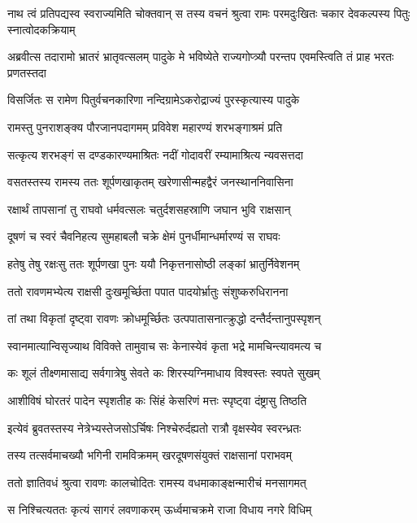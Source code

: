 नाथ त्वं प्रतिपद्यस्व स्वराज्यमिति चोक्तवान्
\twolineshloka
{स तस्य वचनं श्रुत्वा रामः परमदुःखितः}
{चकार देवकल्पस्य पितुः स्नात्वोदकक्रियाम्}


\threelineshloka
{अब्रवीत्स तदारामो भ्रातरं भ्रातृवत्सलम्}
{पादुके मे भविष्येते राज्यगोप्त्र्यौ परन्तप}
{एवमस्त्विति तं प्राह भरतः प्रणतस्तदा}


\twolineshloka
{विसर्जितः स रामेण पितुर्वचनकारिणा}
{नन्दिग्रामेऽकरोद्राज्यं पुरस्कृत्यास्य पादुके}


\twolineshloka
{रामस्तु पुनराशङ्क्य पौरजानपदागमम्}
{प्रविवेश महारण्यं शरभङ्गाश्रमं प्रति}


\twolineshloka
{सत्कृत्य शरभङ्गं स दण्डकारण्यमाश्रितः}
{नदीं गोदावरीं रम्यामाश्रित्य न्यवसत्तदा}


\twolineshloka
{वसतस्तस्य रामस्य ततः शूर्पणखाकृतम्}
{खरेणासीन्महद्वैरं जनस्थाननिवासिना}


\twolineshloka
{रक्षार्थं तापसानां तु राघवो धर्मवत्सलः}
{चतुर्दशसहस्राणि जघान भुवि राक्षसान्}


\twolineshloka
{दूषणं च स्वरं चैवनिहत्य सुमहाबलौ}
{चक्रे क्षेमं पुनर्धीमान्धर्मारण्यं स राघवः}


\twolineshloka
{हतेषु तेषु रक्षःसु ततः शूर्पणखा पुनः}
{ययौ निकृत्तनासोष्ठी लङ्कां भ्रातुर्निवेशनम्}


\twolineshloka
{ततो रावणमभ्येत्य राक्षसी दुःखमूर्च्छिता}
{पपात पादयोर्भ्रातुः संशुष्करुधिरानना}


\twolineshloka
{तां तथा विकृतां दृष्ट्वा रावणः क्रोधमूर्च्छितः}
{उत्पपातासनात्क्रुद्धो दन्तैर्दन्तानुपस्पृशन्}


\twolineshloka
{स्वानमात्यान्विसृज्याथ विविक्ते तामुवाच सः}
{केनास्येवं कृता भद्रे मामचिन्त्यावमत्य च}


\twolineshloka
{कः शूलं तीक्ष्णमासाद्य सर्वगात्रेषु सेवते}
{कः शिरस्यग्निमाधाय विश्वस्तः स्वपते सुखम्}


\twolineshloka
{आशीविषं घोरतरं पादेन स्पृशतीह कः}
{सिंहं केसरिणं मत्तः स्पृष्ट्वा दंष्ट्रासु तिष्ठति}


\twolineshloka
{इत्येवं ब्रुवतस्तस्य नेत्रेभ्यस्तेजसोऽर्चिषः}
{निश्चेरुर्दह्यतो रात्रौ वृक्षस्येव स्वरन्ध्रतः}


\twolineshloka
{तस्य तत्सर्वमाचख्यौ भगिनी रामविक्रमम्}
{खरदूषणसंयुक्तं राक्षसानां पराभवम्}


\twolineshloka
{ततो ज्ञातिवधं श्रुत्वा रावणः कालचोदितः}
{रामस्य वधमाकाङ्क्षन्मारीचं मनसागमत्}


\twolineshloka
{स निश्चित्यततः कृत्यं सागरं लवणाकरम्}
{ऊर्ध्वमाचक्रमे राजा विधाय नगरे विधिम्}


